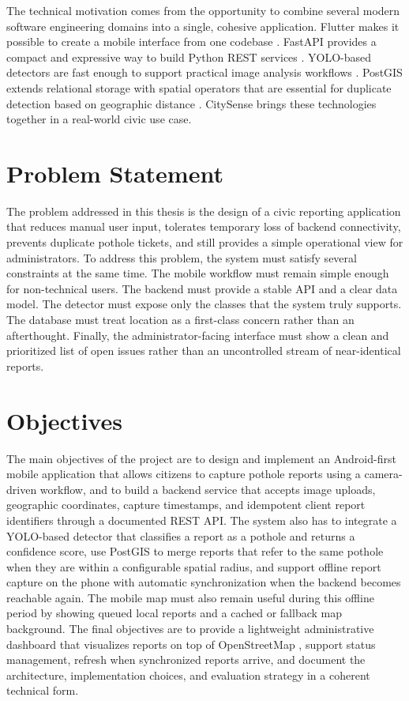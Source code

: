 The technical motivation comes from the opportunity to combine several modern software engineering domains into a single, cohesive application. Flutter makes it possible to create a mobile interface from one codebase \cite{flutter_docs}. FastAPI provides a compact and expressive way to build Python REST services \cite{fastapi_docs}. YOLO-based detectors are fast enough to support practical image analysis workflows \cite{redmon2016yolo, jocher2023ultralytics}. PostGIS extends relational storage with spatial operators that are essential for duplicate detection based on geographic distance \cite{obe2021postgis}. CitySense brings these technologies together in a real-world civic use case.

\section{Problem Statement}

The problem addressed in this thesis is the design of a civic reporting application that reduces manual user input, tolerates temporary loss of backend connectivity, prevents duplicate pothole tickets, and still provides a simple operational view for administrators. To address this problem, the system must satisfy several constraints at the same time. The mobile workflow must remain simple enough for non-technical users. The backend must provide a stable API and a clear data model. The detector must expose only the classes that the system truly supports. The database must treat location as a first-class concern rather than an afterthought. Finally, the administrator-facing interface must show a clean and prioritized list of open issues rather than an uncontrolled stream of near-identical reports.

\section{Objectives}

The main objectives of the project are to design and implement an Android-first mobile application that allows citizens to capture pothole reports using a camera-driven workflow, and to build a backend service that accepts image uploads, geographic coordinates, capture timestamps, and idempotent client report identifiers through a documented REST API. The system also has to integrate a YOLO-based detector that classifies a report as a pothole and returns a confidence score, use PostGIS to merge reports that refer to the same pothole when they are within a configurable spatial radius, and support offline report capture on the phone with automatic synchronization when the backend becomes reachable again. The mobile map must also remain useful during this offline period by showing queued local reports and a cached or fallback map background. The final objectives are to provide a lightweight administrative dashboard that visualizes reports on top of OpenStreetMap \cite{openstreetmap}, support status management, refresh when synchronized reports arrive, and document the architecture, implementation choices, and evaluation strategy in a coherent technical form.

